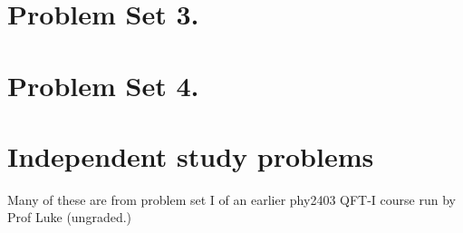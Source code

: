 %
{%
\relax%
}%
{%
   \chapter{Problem Set 3.}

      
      
      
      

   \chapter{Problem Set 4.}

      
      
      
      
%
}%

   \chapter{Independent study problems}

   Many of these are from problem set I of an earlier phy2403 QFT-I course run by Prof Luke (ungraded.)

      
      
      
      
      
      

      
      
      
